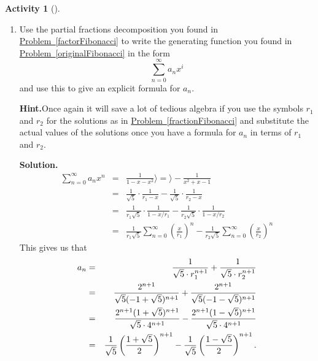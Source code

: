 \documentclass[10pt,]{book}
\theoremstyle{plain}
\theoremstyle{definition}
\newtheorem{activity}[project]{Activity}
\numberwithin{equation}{chapter}
\newcommand{\amp}{&}
\begin{document}
\begin{activity}[]\label{activity-194}
~\par
\begin{enumerate}[label=(\alph*)]
 \item Use the partial fractions decomposition you found in \hyperref[factorFibonacci]{Problem~\ref{factorFibonacci}} to write the generating function you found in \hyperref[originalFibonacci]{Problem~\ref{originalFibonacci}} in the form%
\begin{equation*}
\sum_{n=0}^\infty a_nx^i
\end{equation*}
and use this to give an explicit formula for \(a_n\).%
\par\medskip\noindent%
\textbf{Hint.}\quad Once again it will save a lot of tedious algebra if you use the symbols \(r_1\) and \(r_2\) for the solutions as in \hyperref[fractionFibonacci]{Problem~\ref{fractionFibonacci}} and substitute the actual values of the solutions once you have a formula for \(a_n\) in terms of \(r_1\) and \(r_2\).%
\par\medskip\noindent%
\textbf{Solution.}\quad %
\begin{align*}
\sum_{n=0}^\infty a_nx^n \amp =\amp \frac{1}{1-x-x^2}\rangle =\rangle -\frac{1}{x^2+x-1}\\
\amp =\amp \frac{1}{\sqrt{5}}\cdot\frac{1}{r_1-x} -\frac{1}{\sqrt{5}}\cdot\frac{1}{r_2-x}\\
\amp =\amp \frac{1}{r_1\sqrt{5}}\cdot\frac{1}{1-x/r_1} -\frac{1}{r_2\sqrt{5}}\cdot\frac{1}{1-x/r_2}\\
\amp =\amp \frac{1}{r_1\sqrt{5}}\sum_{n=0}^\infty\left(\frac{x}{r_1}\right)^n
-\frac{1}{r_2\sqrt{5}}\sum_{n=0}^\infty  \left(\frac{x}{r_2}\right)^n
\end{align*}
This gives us that%
\begin{align*}
a_n\amp =\amp \frac{1}{\sqrt{5}\cdot r_1^{n+1}}
+\frac{1}{\sqrt{5}\cdot r_2^{n+1}}\\
\amp =\amp {2^{n+1}\over\sqrt{5}(-1+\sqrt{5})^{n+1}}
+{2^{n+1}\over\sqrt{5}(-1-\sqrt{5})^{n+1}}\\
\amp =\amp {2^{n+1}(1+\sqrt{5})^{n+1}\over
\sqrt{5}\cdot
4^{n+1}}-{2^{n+1}(1-\sqrt{5})^{n+1}\over\sqrt{5}\cdot4^{n+1}}\\
\amp =\amp \frac{1}{\sqrt{5}}\left({1+\sqrt{5}\over 2}\right)^{n+1}-
\frac{1}{\sqrt{5}}\left({1-\sqrt{5} \over2}\right)^{n+1}.
\end{align*}
%


\end{enumerate}
\end{activity}
\end{document}
